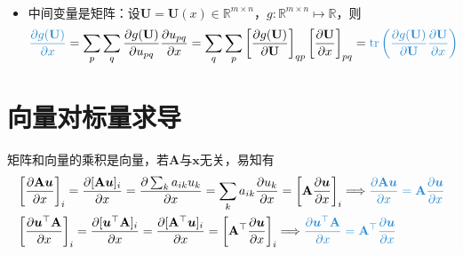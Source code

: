 \documentclass{ctexart}
\newcommand{\blue}[1]{\textcolor{Solarized-blue}{#1}}
\theoremstyle{definition}
\def \uv {\bm{u}}
\def \xv {\bm{x}}
\def \Av {\mathbf{A}}
\def \Uv {\mathbf{U}}
\def \Rbb {\mathbb{R}}
\def \tr {\mathrm{tr}}
\begin{document}
\begin{itemize}
\begin{align*}
          \end{align*}
    \item 中间变量是矩阵：设$\Uv = \Uv(x) \in \Rbb^{m \times n}$，$g: \Rbb^{m \times n} \mapsto \Rbb$，则
          \begin{align} \label{eq: chain-matrix}
              \blue{\frac{\partial g(\Uv)}{\partial x}} = \sum_p \sum_q \frac{\partial g(\Uv)}{\partial u_{pq}} \frac{\partial u_{pq}}{\partial x} = \sum_q \sum_p \left[ \frac{\partial g(\Uv)}{\partial \Uv} \right]_{qp} \left[ \frac{\partial \Uv}{\partial x} \right]_{pq} = \blue{\tr \left( \frac{\partial g(\Uv)}{\partial \Uv} \frac{\partial \Uv}{\partial x} \right)}
          \end{align}
\end{itemize}


\section{向量对标量求导}

矩阵和向量的乘积是向量，若$\Av$与$\xv$无关，易知有
\begin{align*}
     & \left[ \frac{\partial \Av \uv}{\partial x} \right]_{i} = \frac{\partial [\Av \uv]_i}{\partial x} = \frac{\partial \sum_k a_{ik} u_k}{\partial x} = \sum_k a_{ik} \frac{\partial u_k}{\partial x} = \left[ \Av \frac{\partial \uv}{\partial x} \right]_i \Longrightarrow \blue{\frac{\partial \Av \uv}{\partial x} = \Av \frac{\partial \uv}{\partial x}} \\
     & \left[ \frac{\partial \uv^\top \Av}{\partial x} \right]_i = \frac{\partial [\uv^\top \Av]_i}{\partial x} = \frac{\partial [\Av^\top \uv]_i}{\partial x} = \left[ \Av^\top \frac{\partial \uv}{\partial x} \right]_i \Longrightarrow \blue{\frac{\partial \uv^\top \Av}{\partial x} = \Av^\top \frac{\partial \uv}{\partial x}}
\end{align*}
\end{document}
